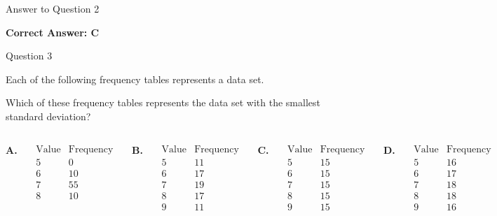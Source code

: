 \documentclass{beamer}
\begin{document}
\begin{frame}{Answer to Question 2}

\textbf{Correct Answer: C}

\end{frame}


\begin{frame}{Question 3}
\footnotesize

Each of the following frequency tables represents a data set.

Which of these frequency tables represents the data set with the smallest standard deviation?

\vspace{0.25cm}

\begin{columns}
\textbf{A.}

\[
\begin{array}{c|c}
\text{Value} & \text{Frequency}\\
\hline
5 & 0\\
6 & 10\\
7 & 55\\
8 & 10
\end{array}
\]

\textbf{B.}

\[
\begin{array}{c|c}
\text{Value} & \text{Frequency}\\
\hline
5 & 11\\
6 & 17\\
7 & 19\\
8 & 17\\
9 & 11
\end{array}
\]

\textbf{C.}

\[
\begin{array}{c|c}
\text{Value} & \text{Frequency}\\
\hline
5 & 15\\
6 & 15\\
7 & 15\\
8 & 15\\
9 & 15
\end{array}
\]

\textbf{D.}

\[
\begin{array}{c|c}
\text{Value} & \text{Frequency}\\
\hline
5 & 16\\
6 & 17\\
7 & 18\\
8 & 18\\
9 & 16
\end{array}
\]

\end{columns}

\end{frame}
\end{document}
